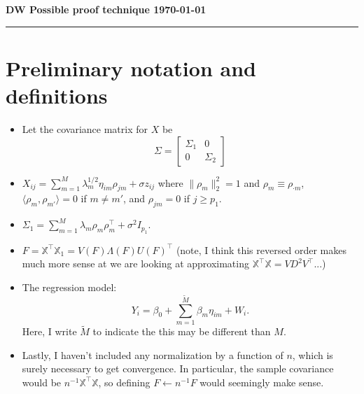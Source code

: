 \documentclass[11pt]{article}
\newcommand{\R}{\mathbb{R}}
\newcommand{\norm}[1]{\lVert #1 \rVert}
\newcommand{\X}{\mathbb{X}}
\begin{document}
\noindent\textbf{\sc DW
        \hfill Possible proof technique
        \hfill \today}
\rule{6.5in}{1pt}
\section{Preliminary notation and definitions}
\begin{itemize}
\item 
Let the covariance matrix for $X$ be
\begin{equation}
\Sigma 
= 
 \begin{bmatrix} 
 \Sigma_{1} & 0  \\ 0 & \Sigma_2 
 \end{bmatrix}
\end{equation}
\item
$
X_{ij} = \sum_{m=1}^M \lambda_m^{1/2}\eta_{im} \rho_{jm} + \sigma z_{ij}
$
where $\norm{\rho_{m}}_2^2 = 1$ and $\rho_{ m} \equiv \rho_{\cdot m}$, $\langle \rho_m, \rho_{m'} \rangle = 0$ if $m \neq m'$, and $\rho_{jm} = 0$ if $j \geq p_1$.
\item $\Sigma_1 = \sum_{m=1}^M \lambda_m \rho_m \rho_m^\top + \sigma^2 I_{p_1}$.
\item $F = \X^{\top}\X_1 = V(F) \Lambda(F) U(F)^{\top}$ (note, I think this reversed order makes much more sense at we are looking at approximating $\X^{\top}\X = VD^2V^{\top}$...)
\item The regression model: 
\begin{equation}
Y_i = \beta_0 + \sum_{m=1}^{\tilde{M}} \beta_m  \eta_{im} + W_i.
\label{eq:YregModel}
\end{equation}
Here, I write $\tilde{M}$ to indicate the this may be different than $M$.  
\item Lastly, I haven't included any normalization by a function of $n$, which is surely necessary to get convergence.  In particular, the sample covariance would be $n^{-1}\X^{\top}\X$,
so defining $F \leftarrow n^{-1}F$ would seemingly make sense.
\end{itemize}
\end{document}
